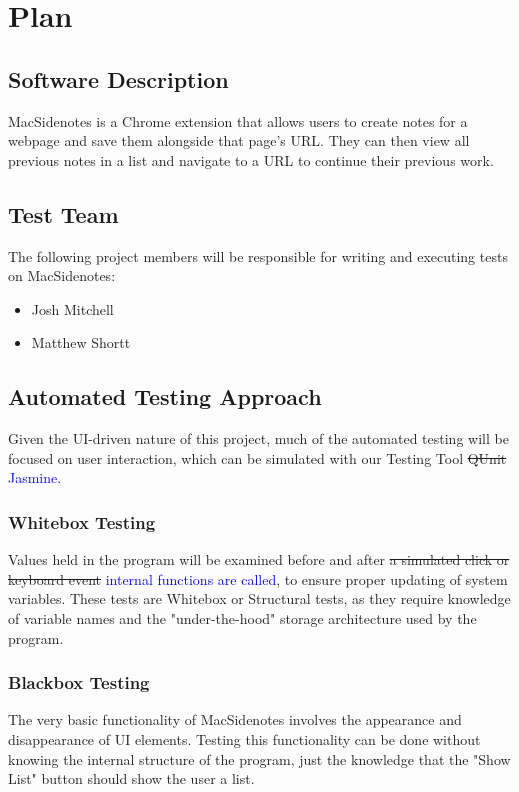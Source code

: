 \documentclass[12pt, titlepage]{article}
\begin{document}
\section{Plan}
	
\subsection{Software Description}

MacSidenotes is a Chrome extension that allows users to create notes for a 
webpage and save them alongside that page's URL. They can then view all 
previous notes in a list and navigate to a URL to continue their previous work.

\subsection{Test Team}

The following project members will be responsible for writing and executing 
tests on MacSidenotes:

\begin{itemize}
	\item Josh Mitchell
	\item Matthew Shortt
\end{itemize}

\subsection{Automated Testing Approach}

Given the UI-driven nature of this project, much of the automated testing 
will be focused on user interaction, which can be simulated with our Testing 
Tool \sout{QUnit}\textcolor{blue}{ Jasmine}.
\subsubsection{Whitebox Testing}
Values held in the program will be examined before and after \sout{a 
simulated click or keyboard event} \textcolor{blue}{internal functions are 
called}, to ensure proper updating of system 
variables. These tests are Whitebox or Structural tests, as they require 
knowledge of variable names and the "under-the-hood" storage architecture used 
by the program.
\subsubsection{Blackbox Testing}
The very basic functionality of MacSidenotes involves the appearance and 
disappearance of UI elements. Testing this functionality can be done without 
knowing the internal structure of the program, just the knowledge that the 
"Show List" button should show the user a list.
\end{document}
